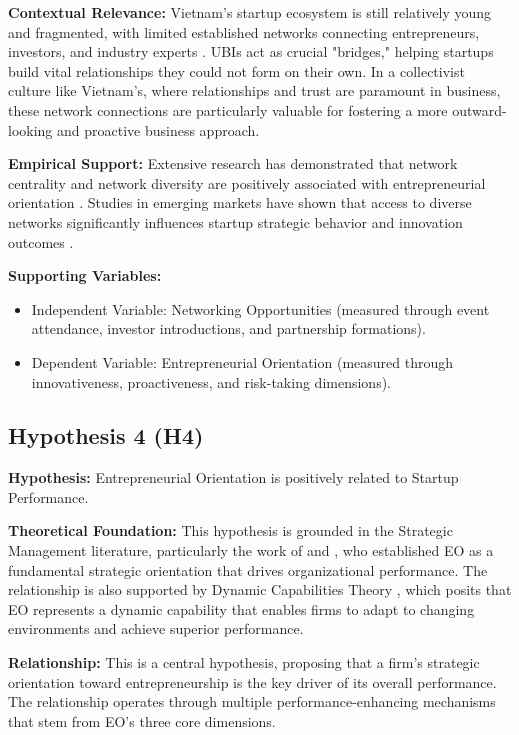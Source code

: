 \documentclass[../Main.tex]{subfiles}
\begin{document}
    \textbf{Contextual Relevance:} Vietnam's startup ecosystem is still relatively young and fragmented, with limited established networks connecting entrepreneurs, investors, and industry experts \cite{spigel2017relational}. UBIs act as crucial "bridges," helping startups build vital relationships they could not form on their own. In a collectivist culture like Vietnam's, where relationships and trust are paramount in business, these network connections are particularly valuable for fostering a more outward-looking and proactive business approach.
    
    \textbf{Empirical Support:} Extensive research has demonstrated that network centrality and network diversity are positively associated with entrepreneurial orientation \cite{stam2008entrepreneurial}. Studies in emerging markets have shown that access to diverse networks significantly influences startup strategic behavior and innovation outcomes \cite{batjargal2003social}.
    
    \textbf{Supporting Variables:}
    \begin{itemize}
        \item Independent Variable: Networking Opportunities (measured through event attendance, investor introductions, and partnership formations).
        \item Dependent Variable: Entrepreneurial Orientation (measured through innovativeness, proactiveness, and risk-taking dimensions).
    \end{itemize}

    \subsection{Hypothesis 4 (H4)}
    \textbf{Hypothesis:} Entrepreneurial Orientation is positively related to Startup Performance.
    
    \textbf{Theoretical Foundation:} This hypothesis is grounded in the Strategic Management literature, particularly the work of \cite{miller1983correlates} and \cite{covin1989strategic}, who established EO as a fundamental strategic orientation that drives organizational performance. The relationship is also supported by Dynamic Capabilities Theory \cite{teece1997dynamic}, which posits that EO represents a dynamic capability that enables firms to adapt to changing environments and achieve superior performance.
    
    \textbf{Relationship:} This is a central hypothesis, proposing that a firm's strategic orientation toward entrepreneurship is the key driver of its overall performance. The relationship operates through multiple performance-enhancing mechanisms that stem from EO's three core dimensions.
    
\end{document}
